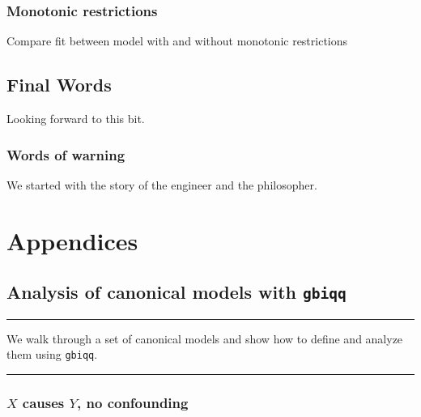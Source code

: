 \documentclass[12pt,]{book}
\begin{document}
\hypertarget{monotonic-restrictions}{%
\section{Monotonic restrictions}\label{monotonic-restrictions}}

Compare fit between model with and without monotonic restrictions

\hypertarget{final-words}{%
\chapter{Final Words}\label{final-words}}

Looking forward to this bit.

\hypertarget{words-of-warning}{%
\section{Words of warning}\label{words-of-warning}}

We started with the story of the engineer and the philosopher.

\hypertarget{part-appendices}{%
\part{Appendices}\label{part-appendices}}

\hypertarget{examplesappendix}{%
\chapter{\texorpdfstring{Analysis of canonical models with \texttt{gbiqq}}{Analysis of canonical models with gbiqq}}\label{examplesappendix}}

\begin{center}\rule{0.5\linewidth}{\linethickness}\end{center}

We walk through a set of canonical models and show how to define and analyze them using \texttt{gbiqq}.

\begin{center}\rule{0.5\linewidth}{\linethickness}\end{center}

\hypertarget{x-causes-y-no-confounding}{%
\section{\texorpdfstring{\(X\) causes \(Y\), no confounding}{X causes Y, no confounding}}\label{x-causes-y-no-confounding}}
\end{document}
